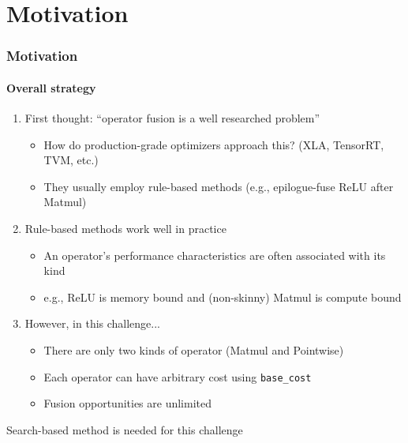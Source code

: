 \section{Motivation}
\begin{frame}
\frametitle{Motivation}
\framesubtitle{Overall strategy}

\begin{enumerate}
  \item First thought: ``operator fusion is a well researched problem''
  \pause
  \begin{itemize}
    \item How do production-grade optimizers approach this? (XLA, TensorRT, TVM, etc.)
    \item They usually employ rule-based methods (e.g., epilogue-fuse ReLU after Matmul)
  \end{itemize}
  \pause
  \item Rule-based methods work well in practice
  \begin{itemize}
    \item An operator's performance characteristics are often associated with its kind
    \item e.g., ReLU is memory bound and (non-skinny) Matmul is compute bound
  \end{itemize}
  \pause
  \item However, in this challenge...
  \begin{itemize}
    \item There are only two kinds of operator (Matmul and Pointwise)
    \item Each operator can have arbitrary cost using \texttt{base\_cost}
    \item Fusion opportunities are unlimited\pause *
  \end{itemize}
\end{enumerate}
\pause
\begin{tcolorbox}
  Search-based method is needed for this challenge
\end{tcolorbox}
\end{frame}
